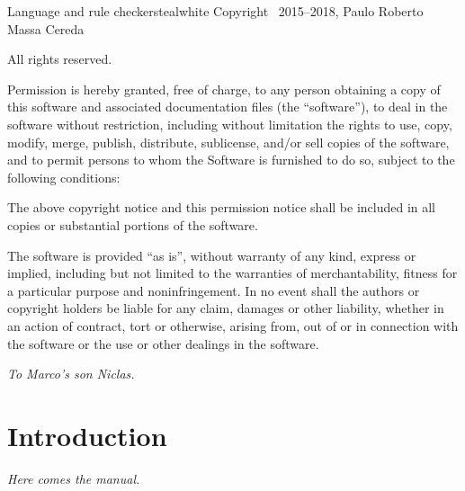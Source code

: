 \documentclass[a4paper,twoside,12pt]{memoir}
\begin{document}
\begin{messagebox}{{Language and rule checkers}}{teal}{\icinfo}{white}
Copyright \textcopyright\ 2015--2018, Paulo Roberto Massa Cereda

All rights reserved.

\vspace{1em}

Permission is hereby granted, free of charge, to any person obtaining a copy of this software and associated documentation files (the ``software''), to deal in the software without restriction, including without limitation the rights to use, copy, modify, merge, publish, distribute, sublicense, and/or sell copies of the software, and to permit persons to whom the Software is furnished to do so, subject to the following conditions:

\vspace{1em}

The above copyright notice and this permission notice shall be included in all copies or substantial portions of the software.

\vspace{1em}

The software is provided ``as is'', without warranty of any kind, express or implied, including but not limited to the warranties of merchantability, fitness for a particular purpose and noninfringement. In no event shall the authors or copyright holders be liable for any claim, damages or other liability, whether in an action of contract, tort or otherwise, arising from, out of or in connection with the software or the use or other dealings in the software.
\end{messagebox}

\cleardoublepage

\vspace*{25em}

\begin{flushright}
\em To Marco's son Niclas.
\end{flushright}

\cleardoublepage

\tableofcontents*

\cleardoublepage

\listoffigures*

\cleardoublepage

\listoftables*

\mainmatter

\chapter{Introduction}
\label{chap:introduction}

\emph{Here comes the manual.}
\end{document}

